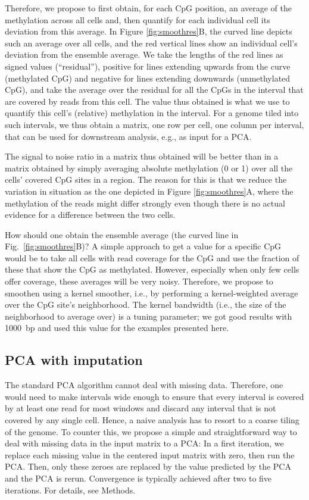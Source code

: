 \documentclass[twocolumn,10pt]{article}
\begin{document}
Therefore, we propose to first obtain, for each CpG position, an average of the methylation across all cells and, then quantify for each individual cell its deviation from this average. In Figure \ref{fig:smoothres}B, the curved line depicts such an average over all cells, and the red vertical lines show an individual cell's deviation from the ensemble average. We take the lengths of the red lines as signed values (``residual''), positive for lines extending upwards from the curve (methylated CpG) and negative for lines extending downwards (unmethylated CpG), and take the average over the residual for all the CpGs in the interval that are covered by reads from this cell. The value thus obtained is what we use to quantify this cell's (relative) methylation in the interval. For a genome tiled into such intervals, we thus obtain a matrix, one row per cell, one column per interval, that can be used for downstream analysis, e.g., as input for a PCA.

The signal to noise ratio in a matrix thus obtained will be better than in a matrix obtained by simply averaging absolute methylation (0 or 1) over all the cells' covered CpG sites in a region. The reason for this is that we reduce the variation in situation as the one depicted in Figure \ref{fig:smoothres}A, where the methylation of the reads might differ strongly even though there is no actual evidence for a difference between the two cells.

How should one obtain the ensemble average (the curved line in Fig.\ \ref{fig:smoothres}B)? A simple approach to get a value for a specific CpG would be to take all cells with read coverage for the CpG and use the fraction of these that show the CpG as methylated. However, especially when only few cells offer coverage, these averages will be very noisy. Therefore, we propose to smoothen using a kernel smoother, i.e., by performing a kernel-weighted average over the CpG site's neighborhood. The kernel bandwidth (i.e., the size of the neighborhood to average over) is a tuning parameter; we got good results with 1000~bp and used this value for the examples presented here.

\subsection{PCA with imputation}

The standard PCA algorithm cannot deal with missing data. Therefore, one would need to make intervals wide enough to ensure that every interval is covered by at least one read for most windows and discard any interval that is not covered by any single cell. Hence, a naive analysis has to resort to a coarse tiling of the genome. To counter this, we propose a simple and straightforward way to deal with missing data in the input matrix to a PCA: In a first iteration, we replace each missing value in the centered input matrix with zero, then run the PCA. Then, only these zeroes are replaced by the value predicted by the PCA and the PCA is rerun. Convergence is typically achieved after two to five iterations. For details, see Methods. 
\end{document}
